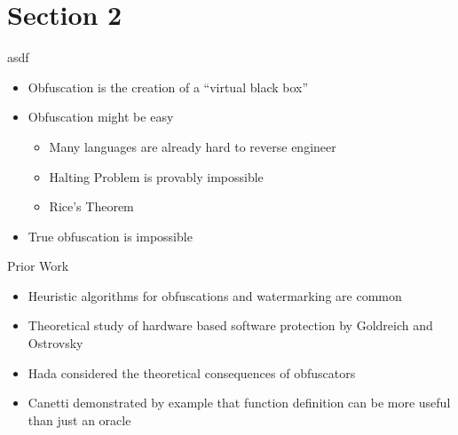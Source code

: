 \documentclass{beamer}
\begin{document}
\section{Section 2}
\begin{frame}{asdf}
    \begin{itemize}
        \item{Obfuscation is the creation of a ``virtual black box''}
        \item<2->{Obfuscation might be easy}
        \begin{itemize}
            \item<3->Many languages are already hard to reverse engineer
            \item<4-> Halting Problem is provably impossible
            \item<5-> Rice’s Theorem
        \end{itemize}
        \item<6-> True obfuscation is impossible
    \end{itemize}
\end{frame}

\begin{frame}{Prior Work}
\begin{itemize}
    \item Heuristic algorithms for obfuscations and watermarking are common
    \item Theoretical study of hardware based software protection by Goldreich and Ostrovsky
    \item Hada considered the theoretical consequences of obfuscators
    \item Canetti demonstrated by example that function definition can be more useful than just an oracle
\end{itemize}
\end{frame}
\end{document}

